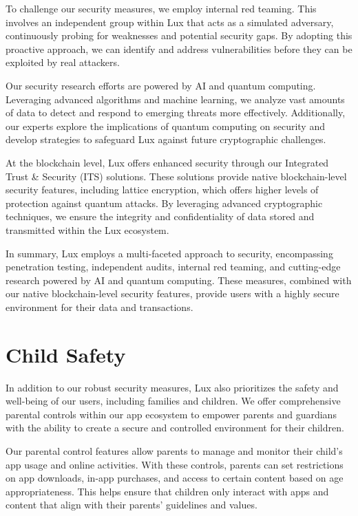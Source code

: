 \documentclass[11pt]{article}
\begin{document}
To challenge our security measures, we employ internal red teaming. This involves an independent group within Lux that acts as a simulated adversary, continuously probing for weaknesses and potential security gaps. By adopting this proactive approach, we can identify and address vulnerabilities before they can be exploited by real attackers.


Our security research efforts are powered by AI and quantum computing. Leveraging advanced algorithms and machine learning, we analyze vast amounts of data to detect and respond to emerging threats more effectively. Additionally, our experts explore the implications of quantum computing on security and develop strategies to safeguard Lux against future cryptographic challenges.


At the blockchain level, Lux offers enhanced security through our Integrated Trust \& Security (ITS) solutions. These solutions provide native blockchain-level security features, including lattice encryption, which offers higher levels of protection against quantum attacks. By leveraging advanced cryptographic techniques, we ensure the integrity and confidentiality of data stored and transmitted within the Lux ecosystem.


In summary, Lux employs a multi-faceted approach to security, encompassing penetration testing, independent audits, internal red teaming, and cutting-edge research powered by AI and quantum computing. These measures, combined with our native blockchain-level security features, provide users with a highly secure environment for their data and transactions.


\section{Child Safety}

In addition to our robust security measures, Lux also prioritizes the safety and well-being of our users, including families and children. We offer comprehensive parental controls within our app ecosystem to empower parents and guardians with the ability to create a secure and controlled environment for their children.


Our parental control features allow parents to manage and monitor their child's app usage and online activities. With these controls, parents can set restrictions on app downloads, in-app purchases, and access to certain content based on age appropriateness. This helps ensure that children only interact with apps and content that align with their parents' guidelines and values.
\end{document}

